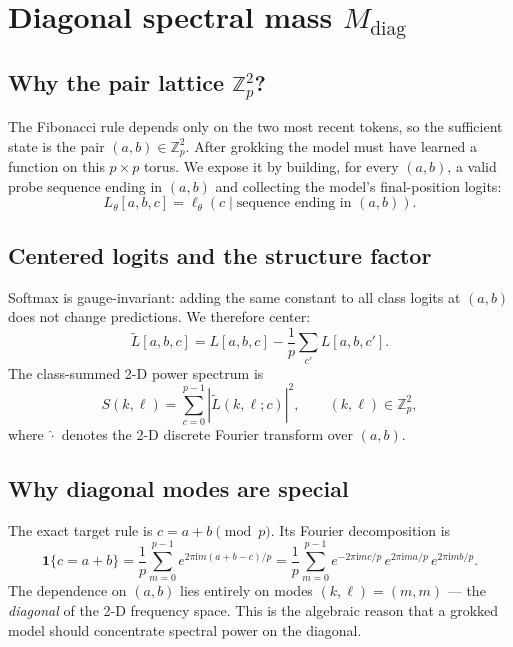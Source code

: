 \documentclass[11pt]{article}
\newcommand{\Zp}{\mathbb{Z}_p}
\newcommand{\ii}{\mathrm{i}}
\newcommand{\diag}{\mathrm{diag}}
\begin{document}
\section{Diagonal spectral mass $M_{\diag}$}
\label{sec:mdiag}

\subsection{Why the pair lattice $\Zp^2$?}

The Fibonacci rule depends only on the two most recent tokens, so the
sufficient state is the pair $(a,b)\in\Zp^2$.
After grokking the model must have learned a function on this
$p\times p$ torus.
We expose it by building, for every $(a,b)$, a valid probe sequence ending
in $(a,b)$ and collecting the model's final-position logits:
\begin{equation}
    L_\theta[a,b,c] = \ell_\theta(c \mid \text{sequence ending in }(a,b)).
\end{equation}

\subsection{Centered logits and the structure factor}

Softmax is gauge-invariant: adding the same constant to all class logits at
$(a,b)$ does not change predictions.
We therefore center:
\begin{equation}
    \tilde{L}[a,b,c]
    = L[a,b,c] - \frac{1}{p}\sum_{c'} L[a,b,c'].
\end{equation}
The class-summed 2-D power spectrum is
\begin{equation}
    S(k,\ell) = \sum_{c=0}^{p-1}
    \left|\widehat{\tilde{L}}(k,\ell;c)\right|^2,
    \qquad (k,\ell)\in\Zp^2,
\end{equation}
where $\widehat{\cdot}$ denotes the 2-D discrete Fourier transform over
$(a,b)$.

\subsection{Why diagonal modes are special}

The exact target rule is $c = a+b \pmod{p}$.
Its Fourier decomposition is
\begin{equation}
    \mathbf{1}\{c=a+b\} = \frac{1}{p}\sum_{m=0}^{p-1}
    e^{2\pi\ii m(a+b-c)/p}
    = \frac{1}{p}\sum_{m=0}^{p-1}
    e^{-2\pi\ii mc/p}\,
    e^{2\pi\ii ma/p}\,
    e^{2\pi\ii mb/p}.
\end{equation}
The dependence on $(a,b)$ lies entirely on modes $(k,\ell)=(m,m)$ --- the
\emph{diagonal} of the 2-D frequency space.
This is the algebraic reason that a grokked model should concentrate spectral
power on the diagonal.
\end{document}
